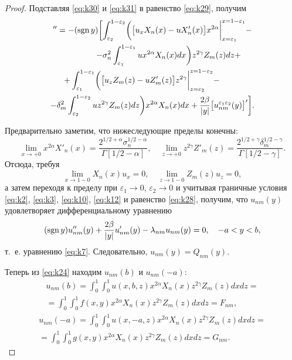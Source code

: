 \begin{proof}
Подставляя \eqref{eq:k30} и \eqref{eq:k31}  в равенство \eqref{eq:k29}, получим
\begin{multline*}
[u_{nm}^{\varepsilon_1\varepsilon_2}(y)]^{\prime\prime}=-(\mathop{\rm sgn}y)
\biggl[
\int_{\varepsilon_2}^{1-\varepsilon_2}
\biggl( \bigl[u_x X_n(x)-uX'_n(x)\bigr]x^{2\alpha} \biggr|_{x=\varepsilon_1}^{x=1-\varepsilon_1}- 
\\
\hfill
-\sigma_n^2\int_{\varepsilon_1}^{1-\varepsilon_1} 
ux^{2\alpha}X_n(x)dx\biggr) z^{2\gamma} Z_m(z)dz+~~~~~
\\
~~~~~
+
\int_{\varepsilon_1}^{1-\varepsilon_1}
\biggl( \bigl[u_z Z_m(z)-uZ'_m(z)\bigr]z^{2\gamma} \biggr|_{z=\varepsilon_2}^{z=1-\varepsilon_2}- \hfill
\\
-\delta_m^2\int_{\varepsilon_2}^{1-\varepsilon_2}
u z^{2\gamma}Z_m(z)dz \biggr) x^{2\alpha}X_n(x)dx+
\frac{2\beta}{|y|} \bigl[u_{nm}^{\varepsilon_1\varepsilon _2}(y)\bigr]^\prime 
\biggr].
\end{multline*}




Предварительно заметим, что нижеследующие пределы конечны:
$$
\lim\limits_{x\to+0}x^{2\alpha}X'_n(x)=\frac{2^{ 1/2 +\alpha}\sigma_n^{ 1/2 -\alpha}}{\Gamma[ 1/2 -\alpha]},\quad \lim\limits_{z\to+0}z^{2\gamma}Z'_m(z)=\frac{2^{ 1/2 +\gamma}\delta_m^{ 1/2 -\gamma}}{\Gamma[ 1/2 -\gamma]}.
$$
Отсюда, требуя 
$$\lim\limits_{x\to1-0}X_n(x)u_x=0,\quad \lim\limits_{z\to1-0}Z_m(z)u_z=0,$$ 
а затем переходя к пределу при $\varepsilon_1\to0$, $\varepsilon_2\to0$ и учитывая граничные условия \eqref{eq:k2}, \eqref{eq:k3}, \eqref{eq:k10}, \eqref{eq:k12} и равенство \eqref{eq:k28}, получим, что $u_{nm}(y)$  удовлетворяет дифференциальному уравнению
$$
(\mathop{\rm sgn}y)u''_{nm}(y)+\frac{2\beta}{|y|}u'_{nm}(y)-\lambda_{nm}u_{nm}(y)=0, \quad -a<y<b,
$$
т.~е. уравнению \eqref{eq:k7}.	Следовательно, $u_{nm}(y)=Q_{nm}(y).$




Теперь из \eqref{eq:k24} находим $u_{nm}(b)$ и $u_{nm}(-a):$
\begin{multline}
u_{nm}(b)=\int_0^1{\int_0^1{u(x,b,z)x^{2\alpha}X_n(x)z^{2\gamma}Z_m(z)dxdz}}= 
\\
=\int_0^1{\int_0^1{f(x,y)x^{2\alpha}X_n(x)z^{2\gamma}Z_m(z)dxdz}}=F_{nm},
\label{eq:k32}
\end{multline}
\begin{multline}
u_{nm}(-a)=\int_0^1{\int_0^1{u(x,-a,z)x^{2\alpha}X_n(x)z^{2\gamma}Z_m(z)dxdz}}= 
\\
=\int_0^1{\int_0^1{g(x,y)x^{2\alpha}X_n(x)z^{2\gamma}Z_m(z)dxdz}}=G_{nm}.
\label{eq:k33}
\end{multline}


\end{proof}
